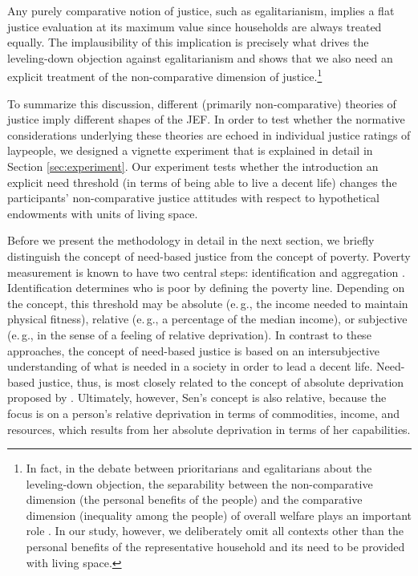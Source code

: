 \documentclass[12pt]{scrartcl}
\begin{document}
Any purely comparative notion of justice, such as egalitarianism, implies a flat justice evaluation at its maximum value since households are always treated equally.
The implausibility of this implication is precisely what drives the leveling-down objection \citep{nozick_anarchy_1974,raz_morality_1986,temkin_inequality_1993}  against egalitarianism and shows that we also need an explicit treatment of the non-comparative dimension of justice.\footnote{In fact, in the debate between prioritarians and egalitarians about the leveling-down objection, the separability between the non-comparative dimension (the personal benefits of the people) and the comparative dimension (inequality among the people) of overall welfare plays an important role \citep[for a careful analysis see, e.\,g.,][]{jensen_what_2003}. In our study, however, we deliberately omit all contexts other than the personal benefits of the representative household and its need to be provided with living space.}

To summarize this discussion, different (primarily non-comparative) theories of justice imply different shapes of the JEF.
In order to test whether the normative considerations underlying these theories are echoed in individual justice ratings of laypeople, we designed a vignette experiment that is explained in detail in Section \ref{sec:experiment}.
Our experiment tests whether the introduction an explicit need threshold (in terms of being able to live a decent life) changes the participants' non-comparative justice attitudes with respect to hypothetical endowments with units of living space.

Before we present the methodology in detail in the next section, we briefly distinguish the concept of need-based justice from the concept of poverty.
Poverty measurement is known to have two central steps: identification and aggregation \citep[for excellent surveys of the literature on poverty measurement, see][]{seidl_poverty_1988,zheng_aggregate_1997}.
Identification determines who is poor by defining the poverty line.
Depending on the concept, this threshold may be absolute (e.\,g., the income needed to maintain physical fitness), relative (e.\,g., a percentage of the median income), or subjective (e.\,g., in the sense of a feeling of relative deprivation).
In contrast to these approaches, the concept of need-based justice is based on an intersubjective understanding of what is needed in a society in order to lead a decent life.
Need-based justice, thus, is most closely related to the concept of absolute deprivation proposed by \citet{sen_poverty_1981}.
Ultimately, however, Sen's concept is also relative, because the focus is on a person's relative deprivation in terms of commodities, income, and resources, which results from her absolute deprivation in terms of her capabilities.
\end{document}
